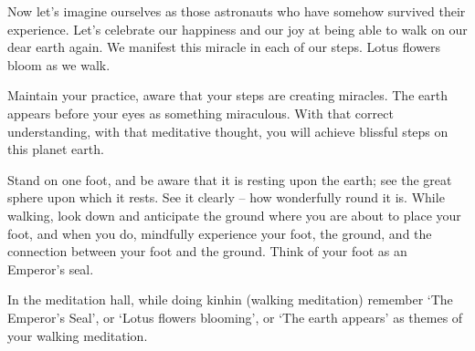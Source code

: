 Now let’s imagine ourselves as those astronauts who have somehow survived their experience.  Let’s celebrate our happiness and our joy at being able to walk on our dear earth again.  We manifest this miracle in each of our steps.  Lotus flowers bloom as we walk.

Maintain your practice, aware that your steps are creating miracles.  The earth appears before your eyes as something miraculous.  With that correct understanding, with that meditative thought, you will achieve blissful steps on this planet earth.

Stand on one foot, and be aware that it is resting upon the earth; see the great sphere upon which it rests.  See it clearly – how wonderfully round it is.  While walking, look down and anticipate the ground where you are about to place your foot, and when you do, mindfully experience your foot, the ground, and the connection between your foot and the ground.  Think of your foot as an Emperor’s seal.

In the meditation hall, while doing kinhin (walking meditation) remember ‘The Emperor’s Seal’, or ‘Lotus flowers blooming’, or ‘The earth appears’ as themes of your walking meditation.
